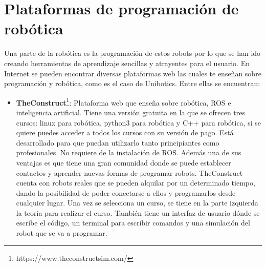 \section{Plataformas de programación de robótica}
Una parte de la robótica es la programación de estos robots por lo que se han ido creando herramientas de aprendizaje sencillas y atrayentes para el usuario. En Internet se pueden encontrar diversas plataformas web las cuales te enseñan sobre programación y robótica, como es el caso de Unibotics. Entre ellas se encuentran:
\newpage
\begin{itemize}
\item \textbf{TheConstruct}\footnote{https://www.theconstructsim.com/}: Plataforma web que enseña sobre robótica, ROS e inteligencia artificial. Tiene una versión gratuita en la que se ofrecen tres cursos: linux para robótica, python3 para robótica y C++ para robótica, si se quiere puedes acceder a todos los cursos con su versión de pago. Está desarrollado para que puedan utilizarlo tanto principiantes como profesionales. No requiere de la instalación de ROS. Además una de sus ventajas es que tiene una gran comunidad donde se puede establecer contactos y aprender nuevas formas de programar robots. TheConstruct cuenta con robots reales que se pueden alquilar por un determinado tiempo, dando la posibilidad de poder conectarse a ellos y programarlos desde cualquier lugar. Una vez se selecciona un curso, se tiene en la parte izquierda la teoría para realizar el curso. También tiene un interfaz de usuario dónde se escribe el código, un terminal para escribir comandos y una simulación del robot que se va a programar.


\end{itemize}
